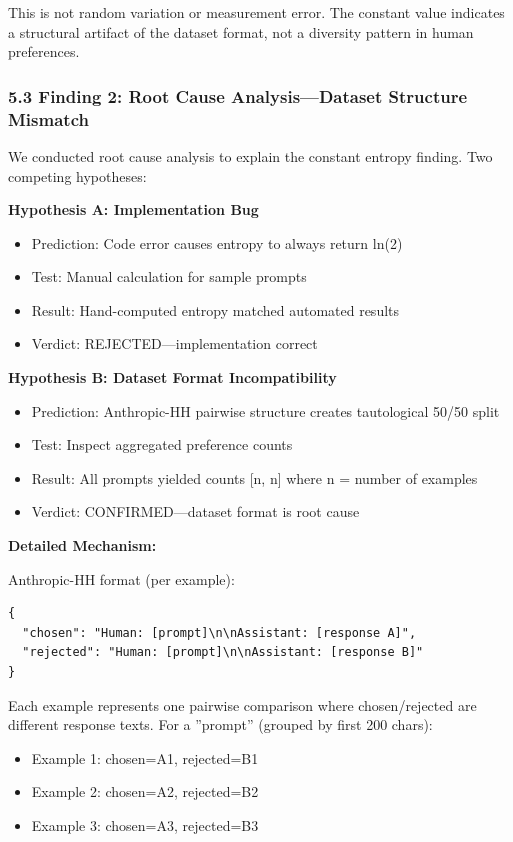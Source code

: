 This is not random variation or measurement error. The constant value indicates a structural artifact of the dataset format, not a diversity pattern in human preferences.

\subsubsection{5.3 Finding 2: Root Cause Analysis---Dataset Structure Mismatch}

We conducted root cause analysis to explain the constant entropy finding. Two competing hypotheses:

\textbf{Hypothesis A: Implementation Bug}
\begin{itemize}
\item Prediction: Code error causes entropy to always return ln(2)
\item Test: Manual calculation for sample prompts
\item Result: Hand-computed entropy matched automated results
\item Verdict: REJECTED---implementation correct
\end{itemize}

\textbf{Hypothesis B: Dataset Format Incompatibility}
\begin{itemize}
\item Prediction: Anthropic-HH pairwise structure creates tautological 50/50 split
\item Test: Inspect aggregated preference counts
\item Result: All prompts yielded counts [n, n] where n = number of examples
\item Verdict: CONFIRMED---dataset format is root cause
\end{itemize}

\textbf{Detailed Mechanism:}

Anthropic-HH format (per example):
\begin{verbatim}
{
  "chosen": "Human: [prompt]\n\nAssistant: [response A]",
  "rejected": "Human: [prompt]\n\nAssistant: [response B]"
}
\end{verbatim}

Each example represents one pairwise comparison where chosen/rejected are different response texts. For a ''prompt'' (grouped by first 200 chars):
\begin{itemize}
\item Example 1: chosen=A1, rejected=B1
\item Example 2: chosen=A2, rejected=B2
\item Example 3: chosen=A3, rejected=B3
\end{itemize}

